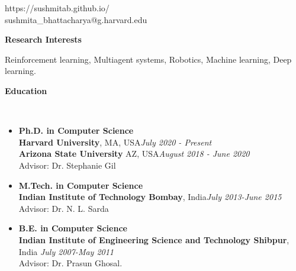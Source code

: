\documentclass[a4paper,11pt]{article}
\newcommand{\lsep}{-0.5cm}
\newcommand{\resheading}[1]{{\small \colorbox{mygrey}{\begin{minipage}{0.975\textwidth}{\textbf{#1 \vphantom{p\^{E}}}}\end{minipage}}}}
\begin{document}
	
	\hfill https://sushmitab.github.io/\\
	\hfill sushmita\_bhattacharya@g.harvard.edu\\
	\setlength{\tabcolsep}{5pt}
	
	\vspace{10pt}
	
	\resheading{\textbf{\large Research Interests}}
	\begin{description}
		\item \hspace{0.75 cm} Reinforcement learning, Multiagent systems, Robotics, Machine learning, Deep learning.
	\end{description}
	
	
	
	\resheading{\textbf{\large Education} }\\[\lsep]
	\begin{description}
		\item 
		\begin{itemize}
			\item \textbf{Ph.D. in Computer Science}\\
			\textbf{Harvard  University}, MA, USA\hfill\textit{July 2020 - Present}\\
			\textbf{Arizona State University} AZ, USA\hfill \textit{August 2018 - June 2020}\\
			Advisor: Dr. Stephanie Gil
		\end{itemize}
		\item
		\begin{itemize}
			\item \textbf{M.Tech. in Computer Science}\\
			\textbf{Indian Institute of Technology Bombay}, India\hfill\textit{July 2013-June 2015}\\
			Advisor: Dr. N. L. Sarda
		\end{itemize}
		\item
		\begin{itemize}
			\item\textbf{B.E. in Computer Science} \hfill\\
			\textbf{Indian Institute of Engineering Science and Technology Shibpur}, India
			\hfill \textit{July 2007-May 2011}\\
			Advisor: Dr. Prasun Ghosal.
		\end{itemize}
	\end{description}
	
\end{document}
